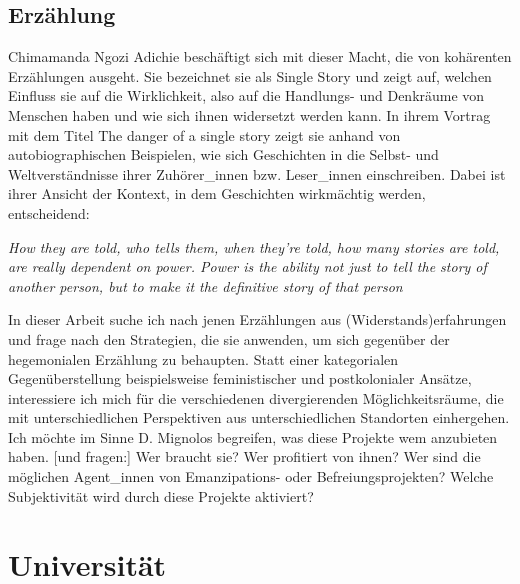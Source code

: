 \subsection{Erzählung} Chimamanda Ngozi Adichie beschäftigt sich mit dieser
Macht, die von kohärenten Erzählungen ausgeht. Sie bezeichnet sie als Single
Story und zeigt auf, welchen Einfluss sie auf die Wirklichkeit, also auf die
Handlungs- und Denkräume von Menschen haben und wie sich ihnen widersetzt werden
kann. In ihrem Vortrag mit dem Titel \glqq The danger of a single story \grqq
zeigt sie anhand von autobiographischen Beispielen, wie sich Geschichten in die
Selbst- und Weltverständnisse ihrer Zuhörer\_innen bzw.  Leser\_innen
einschreiben. Dabei ist ihrer Ansicht der Kontext, in dem Geschichten
wirkmächtig werden, entscheidend: \begin{myenv}

  \textit{ \glqq How they are told, who tells them, when they're told, how many
stories are told, are really dependent on power. Power is the ability not just
to tell the story of another person, but to make it the definitive story of that
person \grqq \footnotemark {} } \end{myenv}

In dieser Arbeit suche ich nach jenen Erzählungen aus (Widerstands)erfahrungen
und frage nach den Strategien, die sie anwenden, um sich gegenüber der
hegemonialen Erzählung zu behaupten. Statt einer kategorialen Gegenüberstellung
beispielsweise feministischer und postkolonialer Ansätze, interessiere ich mich
für die verschiedenen divergierenden Möglichkeitsräume, die mit
unterschiedlichen Perspektiven aus unterschiedlichen Standorten einhergehen. Ich
möchte im Sinne D. Mignolos begreifen, \glqq [...] was diese Projekte wem
anzubieten haben. [und fragen:] Wer braucht sie? Wer profitiert von ihnen? Wer
sind die möglichen Agent\_innen von Emanzipations- oder Befreiungsprojekten?
Welche Subjektivität wird durch diese Projekte aktiviert? \grqq

\section{Universität}

